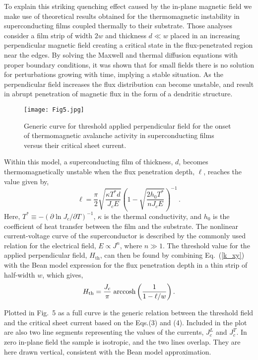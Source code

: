\documentclass[superscriptaddress,twocolumn,aps,
showpacs]{revtex4-1}
\begin{document}
To explain this striking quenching effect caused by the in-plane magnetic field we make use of theoretical results obtained for  the thermomagnetic instability in superconducting films coupled thermally to their substrate.\cite{denisov06-1}
Those analyses consider a film strip of width $2w$ and thickness $d\ll w$ placed in an increasing perpendicular magnetic field  creating a critical state in the flux-penetrated region near the edges.
By solving the Maxwell and  thermal diffusion equations with proper boundary conditions, it was shown that for small fields there is no solution for perturbations growing with time, implying a stable situation.
As the perpendicular field increases the flux distribution can become unstable, and result in abrupt penetration of magnetic flux in the form of a dendritic structure.

\begin{figure}[t]
  \centering
  \texttt{[image: Fig5.jpg]}
  \label{Hth-j}
  \caption{Generic curve for threshold applied perpendicular field for the onset of  thermomagnetic  avalanche activity in superconducting films versus their critical sheet current.}
\end{figure}

Within this model, a  superconducting film of thickness, $d$, becomes thermomagnetically unstable when the flux penetration depth, $\ell$, reaches the value given by,\cite{denisov06}
\begin{equation}
\ell =\frac{\pi}{2} \sqrt{\frac{\kappa  T^{*}d }{J_c E}}
\left( 1 - \sqrt{\frac{2h_0 T^{*}}{nJ_c E}}\right)^{-1}\, .
\label{k_xy}
\end{equation}
Here,  $T^{*} \equiv - (\partial \ln J_c / \partial T)^{-1} $, 
$\kappa$ is the thermal conductivity, and $h_0$ is the coefficient of heat transfer between the film and the substrate.  
The  nonlinear current-voltage curve of the superconductor is described by the commonly used relation for the electrical field, $E \propto J^n$, where $n \gg 1$.
The threshold value for the applied perpendicular field, $H_{\text{th}}$, can then be found by combining Eq.~(\ref{k_xy}) with the Bean model expression for the flux penetration depth in a  thin strip\cite{brandt93, zeldov94} of half-width  $w$,  which gives,\cite{albrecht07}
\begin{equation}
H_{\rm th} =  \frac{J_c}{\pi} \;  {\rm arccosh} \left(\frac{1}{1-
\ell/w}
\right) .
\end{equation}

Plotted in Fig.~5 as a full curve is the generic relation between the  threshold  field and the critical sheet current based on the Eqs.(3) and (4). Included in the plot are also two line segments representing the values of the currents, $J_c^L$ and  $J_c^T$.
In zero in-plane field  the sample is isotropic, and the two lines overlap.
They are here drawn vertical, consistent with the Bean model approximation.
\end{document}
